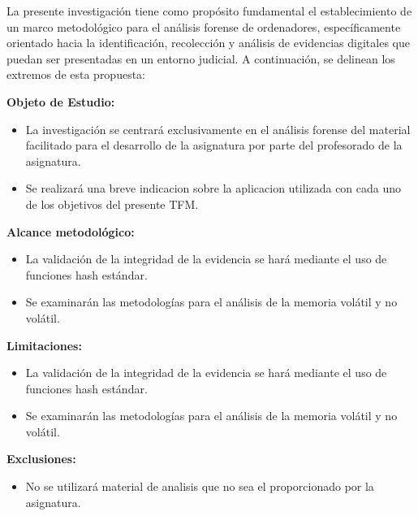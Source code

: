La presente investigación tiene como propósito fundamental el establecimiento de un marco metodológico para el análisis forense de ordenadores, específicamente orientado hacia la identificación, recolección y análisis de evidencias digitales que puedan ser presentadas en un entorno judicial. A continuación, se delinean los extremos de esta propuesta:

\textbf{Objeto de Estudio:}

\begin{itemize}
  \item La investigación se centrará exclusivamente en el análisis forense del material facilitado para el desarrollo de la asignatura por parte del profesorado de la asignatura.
  \item Se realizará una breve indicacion sobre la aplicacion utilizada con cada uno de los objetivos del presente TFM.
\end{itemize}


\textbf{Alcance metodológico:}

\begin{itemize}
  \item La validación de la integridad de la evidencia se hará mediante el uso de funciones hash estándar.
  \item Se examinarán las metodologías para el análisis de la memoria volátil y no volátil.
\end{itemize}


\textbf{Limitaciones:}

\begin{itemize}
  \item La validación de la integridad de la evidencia se hará mediante el uso de funciones hash estándar.
  \item Se examinarán las metodologías para el análisis de la memoria volátil y no volátil.
\end{itemize}


\textbf{Exclusiones:}

\begin{itemize}
  \item No se utilizará material de analisis que no sea el proporcionado por la asignatura.
\end{itemize}


